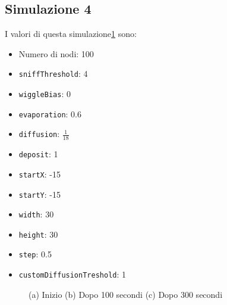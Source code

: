 \subsection{Simulazione 4}\label{sim4}
I valori di questa simulazione\space \cref{fig:sim4} sono:
\begin{itemize}
    \item Numero di nodi: 100
    \item \texttt{sniffThreshold}: 4
    \item \texttt{wiggleBias}: 0
    \item \texttt{evaporation}: 0.6
    \item \texttt{diffusion}: $\frac{1}{18}$
    \item \texttt{deposit}: 1
    \item \texttt{startX}: -15
    \item \texttt{startY}: -15
    \item \texttt{width}: 30
    \item \texttt{height}: 30
    \item \texttt{step}: 0.5
    \item \texttt{customDiffusionTreshold}: 1
\end{itemize}
\begin{figure}[ht]
    \centering
    \caption{(a) Inizio (b) Dopo 100 secondi (c) Dopo 300 secondi}\label{fig:sim4}
\end{figure}

